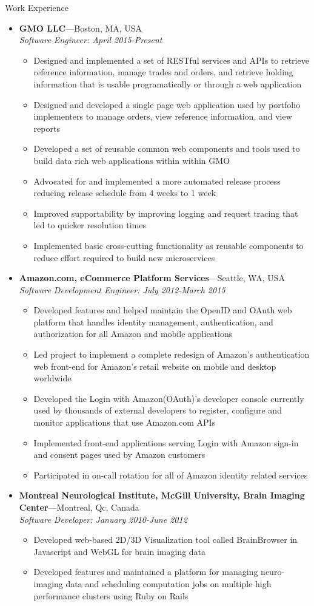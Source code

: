 \documentclass[10pt,oneside]{article}
\newenvironment{ressection}[1]{
  \vspace{4pt}
	 {\fontfamily{phv}\selectfont\Large#1}
	 \begin{itemize}
	   \vspace{3pt}
}{
	 \end{itemize}
}
\newcommand{\ressubitem}[1]{
  \vspace{-1pt}
\item \begin{flushleft} #1 \end{flushleft}
}
\newcommand{\resbigitem}[3]{
  \vspace{-5pt}
\item
  \textbf{#1}---#2 \\
  \textit{#3}
}
\newenvironment{ressubsec}[3]{
  \resbigitem{#1}{#2}{#3}
  \vspace{-2pt}
  \begin{itemize}
}{
  \end{itemize}
}
\begin{document}
\begin{ressection}{Work Experience}
  \begin{ressubsec}{GMO LLC}{Boston, MA, USA}{Software Engineer: April 2015-Present}  
    \ressubitem {Designed and implemented a set of RESTful services and APIs to retrieve reference information, manage trades and orders, and retrieve holding information that is usable programatically or through a web application}
    \ressubitem {Designed and developed a single page web application used by portfolio implementers to manage orders, view reference information, and view reports}
    \ressubitem {Developed a set of reusable common web components and tools used to build data rich web applications within within GMO}
    \ressubitem {Advocated for and implemented a more automated release process reducing release schedule from 4 weeks to 1 week}
    \ressubitem {Improved supportability by improving logging and request tracing that led to quicker resolution times}
    \ressubitem {Implemented basic cross-cutting functionality as reusable components to reduce effort required to build new microservices}
  \end{ressubsec}
  \begin{ressubsec}{Amazon.com, eCommerce Platform Services}{Seattle, WA, USA}{Software Development Engineer: July 2012-March 2015}  
    \ressubitem {Developed features and helped  maintain the OpenID and OAuth web platform that handles identity management, authentication, and authorization for all Amazon and mobile applications}
    \ressubitem {Led project to implement a complete redesign of Amazon's authentication web front-end for Amazon's retail website on mobile and desktop worldwide}
    \ressubitem {Developed the Login with Amazon(OAuth)'s developer console currently used by thousands of external developers to register, configure and monitor applications that use Amazon.com APIs}
    \ressubitem {Implemented front-end applications serving Login with Amazon sign-in and consent pages used by Amazon customers}
    \ressubitem {Participated in on-call rotation for all of Amazon identity related services}
  \end{ressubsec}
  \begin{ressubsec}{Montreal Neurological Institute, McGill University, Brain Imaging Center}{Montreal, Qc, Canada}{Software Developer: January 2010-June 2012}
    \ressubitem {Developed web-based 2D/3D Visualization tool called BrainBrowser in Javascript and WebGL for brain imaging data}
    \ressubitem {Developed features and maintained a platform for managing neuro-imaging data and scheduling computation jobs on multiple high performance clusters using Ruby on Rails}

\end{ressubsec}
\end{ressection}
\end{document}
